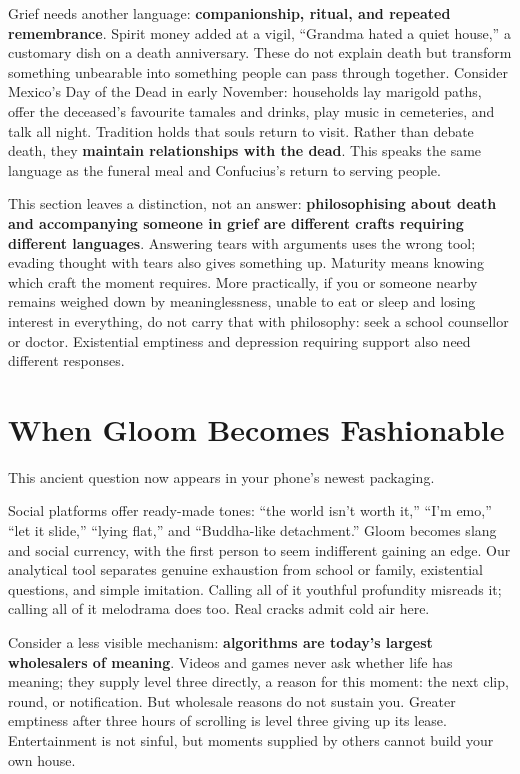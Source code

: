 Grief needs another language: \textbf{companionship, ritual, and repeated remembrance}. Spirit money added at a vigil, ``Grandma hated a quiet house,'' a customary dish on a death anniversary. These do not explain death but transform something unbearable into something people can pass through together. Consider Mexico's Day of the Dead in early November: households lay marigold paths, offer the deceased's favourite tamales and drinks, play music in cemeteries, and talk all night. Tradition holds that souls return to visit. Rather than debate death, they \textbf{maintain relationships with the dead}. This speaks the same language as the funeral meal and Confucius's return to serving people.

This section leaves a distinction, not an answer: \textbf{philosophising about death and accompanying someone in grief are different crafts requiring different languages}. Answering tears with arguments uses the wrong tool; evading thought with tears also gives something up. Maturity means knowing which craft the moment requires. More practically, if you or someone nearby remains weighed down by meaninglessness, unable to eat or sleep and losing interest in everything, do not carry that with philosophy: seek a school counsellor or doctor. Existential emptiness and depression requiring support also need different responses.

\section{When Gloom Becomes Fashionable}
This ancient question now appears in your phone's newest packaging.

Social platforms offer ready-made tones: ``the world isn't worth it,'' ``I'm emo,'' ``let it slide,'' ``lying flat,'' and ``Buddha-like detachment.'' Gloom becomes slang and social currency, with the first person to seem indifferent gaining an edge. Our analytical tool separates genuine exhaustion from school or family, existential questions, and simple imitation. Calling all of it youthful profundity misreads it; calling all of it melodrama does too. Real cracks admit cold air here.

Consider a less visible mechanism: \textbf{algorithms are today's largest wholesalers of meaning}. Videos and games never ask whether life has meaning; they supply level three directly, a reason for this moment: the next clip, round, or notification. But wholesale reasons do not sustain you. Greater emptiness after three hours of scrolling is level three giving up its lease. Entertainment is not sinful, but moments supplied by others cannot build your own house.

